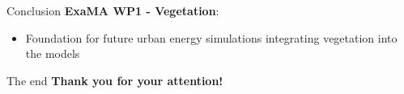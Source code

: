 \documentclass[10pt]{beamer}
\begin{document}
\begin{frame}{Conclusion}
  \Large
  \textbf{ExaMA WP1 - Vegetation}:
  \begin{itemize}
    \item Foundation for future urban energy simulations
    integrating vegetation into the models
  \end{itemize}
\end{frame}

\begin{frame}{The end}
  \Large
  \centering
  \textbf{Thank you for your attention!}
\end{frame}

\nocite{*}


\end{document}
